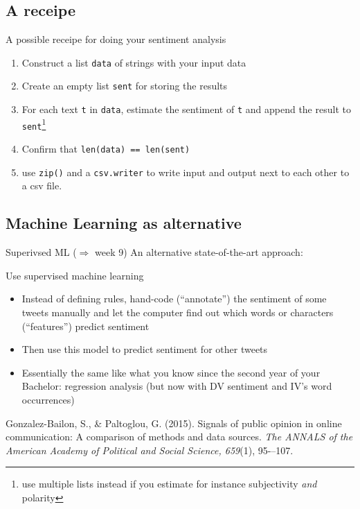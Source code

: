 \documentclass{beamer}
\begin{document}
\subsection{A receipe}

\begin{frame}{A possible receipe for doing your sentiment analysis}
	
\begin{enumerate}
	\item Construct a list \texttt{data} of strings with your input data
	\item Create an empty list \texttt{sent} for storing the results
	\item For each text \texttt{t} in \texttt{data}, estimate the sentiment of \texttt{t} and append the result to \texttt{sent}\footnote{use multiple lists instead if you estimate for instance subjectivity \emph{and} polarity}
	\item Confirm that \texttt{len(data) == len(sent)}
	\item use \texttt{zip()} and a  \texttt{csv.writer} to write input and output next to each other to a csv file.
\end{enumerate}

\end{frame}



\subsection{Machine Learning as alternative}
\begin{frame}{Superivsed ML ($\Rightarrow$ week 9)}
	An alternative state-of-the-art approach:
	\begin{block}{Use supervised machine learning}
		\begin{itemize}
			\item Instead of defining rules, hand-code (``annotate'') the sentiment of some tweets manually and let the computer find out which words or characters (``features'') predict sentiment
			\item Then use this model to predict sentiment for other tweets
			\item Essentially the same like what you know since the second year of your Bachelor: regression analysis (but now with DV sentiment and IV's word occurrences)
		\end{itemize}
		\tiny{Gonzalez-Bailon, S., \& Paltoglou, G. (2015). Signals of public opinion in online communication: A comparison of methods and data sources. \emph{The ANNALS of the American Academy of Political and Social Science, 659}(1), 95-–107.}
	\end{block}
	
\end{frame}
\end{document}
